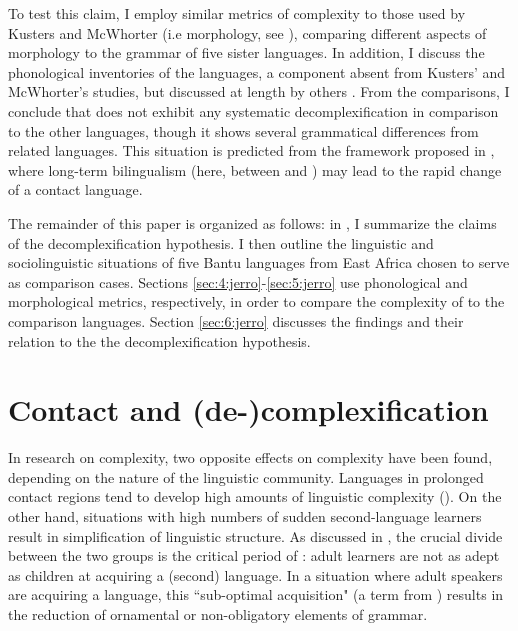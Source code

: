 \documentclass[output=paper,
modfonts
]{langscibook}
\begin{document}

To test this claim, I employ similar metrics of complexity to those used by Kusters and McWhorter (i.e morphology, see ), comparing different aspects of  morphology to the grammar of five sister languages. In addition, I discuss the phonological inventories of the languages, a component absent from Kusters' and McWhorter's studies, but discussed at length by others \citep{Hay2007,Trudgill2011}. From the comparisons, I conclude that  does not exhibit any systematic decomplexification in comparison to the other languages, though it shows several grammatical differences from related languages. This situation is predicted from the framework proposed in \citet{Trudgill2011}, where long-term bilingualism (here, between  and ) may lead to the rapid change of a contact language. 
	
The remainder of this paper is organized as follows: in , I summarize the claims of the decomplexification hypothesis. I then outline the linguistic and sociolinguistic situations of five Bantu languages from East Africa chosen to serve as comparison cases. Sections \ref{sec:4:jerro}-\ref{sec:5:jerro} use phonological and morphological metrics, respectively, in order to compare the complexity of  to the comparison languages. Section \ref{sec:6:jerro} discusses the findings and their relation to the the decomplexification hypothesis. %



\section{Contact and (de-)complexification}\label{sec:2:jerro}
In research on complexity, two opposite effects on complexity have been found, depending on the nature of the linguistic community. Languages in prolonged contact regions tend to develop high amounts of linguistic complexity (\citealt{Heine2005,Dahl2004,Givón1984}). On the other hand, situations with high numbers of sudden second-language learners result in simplification of linguistic structure. As discussed in \citet{Trudgill2011}, the crucial divide between the two groups is the critical period of : adult learners are not as adept as children at acquiring a (second) language. In a situation where adult speakers are acquiring a language, this ``sub-optimal acquisition" (a term from \citealt{Dahl2004}) results in the reduction of ornamental or non-obligatory elements of grammar. 
\end{document}
